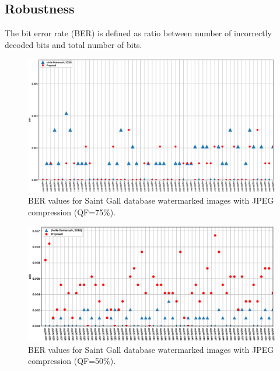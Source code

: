 \documentclass[runningheads]{llncs}
\begin{document}
\subsection{Robustness}
The bit error rate (BER) is defined as ratio between number of incorrectly decoded bits and total number of bits.
\begin{figure}[H]	%
	\begin{center}
		\includegraphics[width=\textwidth]{ber75.eps}
	\end{center}
	\caption{BER values for Saint Gall database watermarked images with JPEG compression (QF=75\%).}
	\label{ber75}
\end{figure}
\begin{figure}[H]	%
	\begin{center}
		\includegraphics[width=\textwidth]{ber50.eps}
	\end{center}
	\caption{BER values for Saint Gall database watermarked images with JPEG compression (QF=50\%).}
	\label{ber50}
\end{figure}
\end{document}
